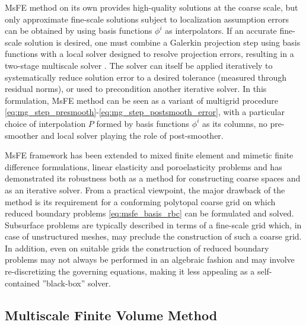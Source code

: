 MsFE method on its own provides high-quality solutions at the coarse scale, but only approximate fine-scale solutions subject to localization assumption errors can be obtained by using basis functions $\phi^i$ as interpolators.   If an accurate fine-scale solution is desired, one must combine a Galerkin projection step using basis functions with a local solver designed to resolve projection errors, resulting in a two-stage multiscale solver \cite{Zhou2012}.   The solver can itself be applied iteratively to systematically reduce solution error to a desired tolerance (measured through residual norms), or used to precondition another iterative solver.   In this formulation, MsFE method can be seen as a variant of multigrid procedure \eqref{eq:mg_step_presmooth}-\eqref{eq:mg_step_postsmooth_error}, with a particular choice of interpolation $P$ formed by basis functions $\phi^i$ as its columns, no pre-smoother and local solver playing the role of post-smoother.

MsFE framework has been extended to mixed finite element \cite{Chen2002} and mimetic finite difference \cite{Lipnikov2008} formulations, linear elasticity \cite{Buck2013,Castelletto2017} and poroelasticity \cite{Brown2016,Castelletto2019} problems and has demonstrated its robustness both as a method for constructing coarse spaces and as an iterative solver.   From a practical viewpoint, the major drawback of the method is its requirement for a conforming polytopal coarse grid on which reduced boundary problems \eqref{eq:msfe_basis_rbc} can be formulated and solved.   Subsurface problems are typically described in terms of a fine-scale grid which, in case of unstructured meshes, may preclude the construction of such a coarse grid.   In addition, even on suitable grids the construction of reduced boundary problems may not always be performed in an algebraic fashion and may involve re-discretizing the governing equations, making it less appealing as a self-contained ''black-box'' solver.

\subsection{Multiscale Finite Volume Method}
\label{subsec:related_work_msfv}

